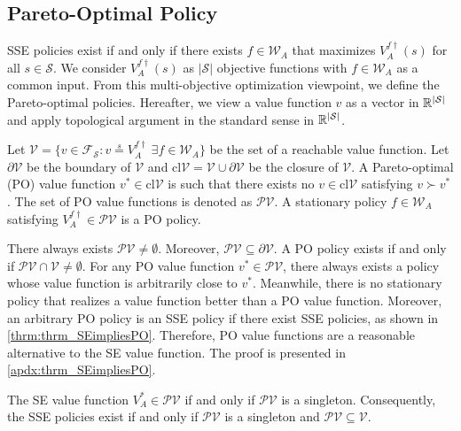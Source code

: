 \documentclass{acml}
\providecommand{\R}{\mathbb{R}} %
\providecommand{\eqs}{\stackrel{s}{=}}
\DeclarePairedDelimiter{\abs}{\lvert}{\rvert}
\begin{document}
\subsection{Pareto-Optimal Policy}\label{sec:po_policy}

SSE policies exist if and only if there exists $f\in\mathcal{W}_A$ that maximizes $V_A^{f\dag}(s)$ for all $s\in\mathcal{S}$.
We consider $V_A^{f\dag}(s)$ as $|\mathcal{S}|$ objective functions with $f\in\mathcal{W}_A$ as a common input.
From this multi-objective optimization viewpoint, we define the Pareto-optimal policies.
Hereafter, we view a value function $v$ as a vector in $\R^{\abs{\mathcal{S}}}$ and apply topological argument in the standard sense in $\R^{\abs{\mathcal{S}}}$. 



\begin{definition}\label{thrm:def_POP}
	Let $\mathcal{V} = \{v \in \mathcal{F}_\mathcal{S} : v \eqs V_A^{f\dag}\ \exists f \in \mathcal{W}_A\}$ be the set of a reachable value function. 
	Let $\partial \mathcal{V}$ be the boundary of $\mathcal{V}$ and 
	$\mathrm{cl}\mathcal{V} = \mathcal{V} \cup \partial\mathcal{V}$ be the closure of $\mathcal{V}$. 
	A Pareto-optimal (PO) value function $v^* \in \mathrm{cl}\mathcal{V}$ is such that there exists no $v \in \mathrm{cl}\mathcal{V}$ satisfying $v \succ v^*$. The set of PO value functions is denoted as $\mathcal{PV}$.
	A stationary policy $f\in \mathcal{W}_A$ satisfying $V_A^{f\dag} \in \mathcal{PV}$ is a PO policy. 
\end{definition}

There always exists $\mathcal{PV} \neq \emptyset$. Moreover, $\mathcal{PV} \subseteq \partial\mathcal{V}$. 
A PO policy exists if and only if $\mathcal{PV} \cap \mathcal{V} \neq \emptyset$. 
For any PO value function $v^* \in \mathcal{PV}$, there always exists a policy whose value function is arbitrarily close to $v^*$. 
Meanwhile, there is no stationary policy that realizes a value function better than a PO value function.
Moreover, an arbitrary PO policy is an SSE policy if there exist SSE policies, as shown in \cref{thrm:thrm_SEimpliesPO}.
Therefore, PO value functions are a reasonable alternative to the SE value function.
The proof is presented in \cref{apdx:thrm_SEimpliesPO}.

\begin{proposition}\label{thrm:thrm_SEimpliesPO}
	The SE value function $V_A^* \in \mathcal{PV}$ if and only if $\mathcal{PV}$ is a singleton. 
	Consequently, the SSE policies exist if and only if $\mathcal{PV}$ is a singleton and $\mathcal{PV} \subseteq \mathcal{V}$.
\end{proposition}
\end{document}
